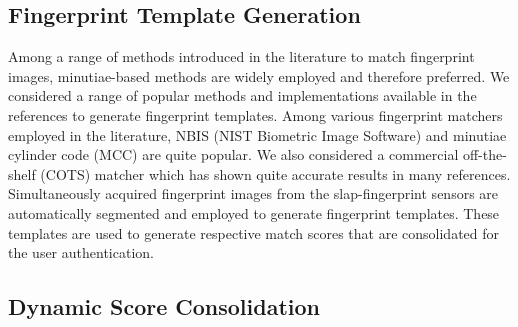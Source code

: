 \subsection{Fingerprint Template Generation\label{fp-template}}

Among a range of methods introduced in the literature \cite{maltoni2009handbook} to match fingerprint images, minutiae-based methods are widely employed and therefore preferred. We considered a range of popular methods and implementations available in the references to generate fingerprint templates. Among various fingerprint matchers employed in the literature, NBIS (NIST Biometric Image Software) \cite{cappelli2010minutia} and minutiae cylinder code (MCC) \cite{watson2007user} are quite popular. We also considered a commercial off-the-shelf (COTS) matcher \cite{verifinger} which has shown quite accurate results in many references. Simultaneously acquired fingerprint images from the slap-fingerprint sensors are automatically segmented and employed to generate fingerprint templates. These templates are used to generate respective match scores that are consolidated for the user authentication. 

\subsection{Dynamic Score Consolidation\label{dynamic-score}}

